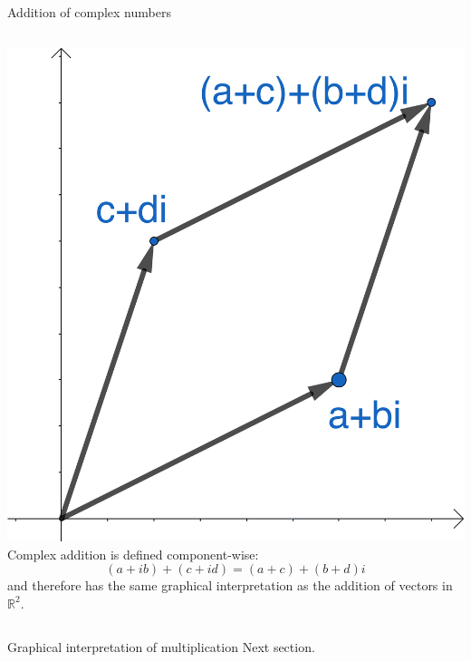 \documentclass{beamer}
\begin{document}
\begin{frame}{Addition of complex numbers}
\begin{columns}
\includegraphics[scale=0.5]{complex-addition.png}
Complex addition is defined component-wise:
\begin{equation*}
(a+ib)+(c+id) = (a+c)+(b+d)i
\end{equation*}
and therefore has the same graphical interpretation as the addition of vectors in $\mathbb{R}^2$.
\end{columns}
\end{frame}

\begin{frame}{Graphical interpretation of multiplication}
Next section.
\end{frame}
\end{document}
